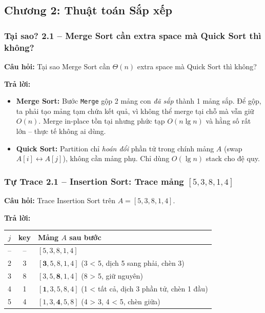 \documentclass[10pt]{article}
\begin{document}
\subsection{Chương 2: Thuật toán Sắp xếp}

\subsubsection{Tại sao? 2.1 -- Merge Sort cần extra space mà Quick Sort thì không?}\label{whyans:2.1}

\textbf{Câu hỏi:} Tại sao Merge Sort cần $\Theta(n)$ extra space mà Quick Sort thì không?

\textbf{Trả lời:}
\begin{itemize}
\item \textbf{Merge Sort:} Bước \texttt{Merge} gộp 2 mảng con \textit{đã sắp} thành 1 mảng sắp. Để gộp, ta phải tạo mảng tạm chứa kết quả, vì không thể merge tại chỗ mà vẫn giữ $O(n)$. Merge in-place tồn tại nhưng phức tạp $O(n \lg n)$ và hằng số rất lớn -- thực tế không ai dùng.
\item \textbf{Quick Sort:} Partition chỉ \textit{hoán đổi} phần tử trong chính mảng $A$ (swap $A[i] \leftrightarrow A[j]$), không cần mảng phụ. Chỉ dùng $O(\lg n)$ stack cho đệ quy.
\end{itemize}

\subsubsection{Tự Trace 2.1 -- Insertion Sort: Trace mảng $[5, 3, 8, 1, 4]$}\label{traceans:2.1}

\textbf{Câu hỏi:} Trace Insertion Sort trên $A = [5, 3, 8, 1, 4]$.

\textbf{Trả lời:}

\begin{center}
\begin{tabular}{|c|c|l|}
\hline
\textbf{$j$} & \textbf{key} & \textbf{Mảng $A$ sau bước} \\
\hline
-- & -- & $[5, 3, 8, 1, 4]$ \\
\hline
2 & 3 & $[\mathbf{3}, 5, 8, 1, 4]$ \quad (3 < 5, dịch 5 sang phải, chèn 3) \\
\hline
3 & 8 & $[3, 5, \mathbf{8}, 1, 4]$ \quad (8 > 5, giữ nguyên) \\
\hline
4 & 1 & $[\mathbf{1}, 3, 5, 8, 4]$ \quad (1 < tất cả, dịch 3 phần tử, chèn 1 đầu) \\
\hline
5 & 4 & $[1, 3, \mathbf{4}, 5, 8]$ \quad (4 > 3, 4 < 5, chèn giữa) \\
\hline
\end{tabular}
\end{center}
\end{document}
